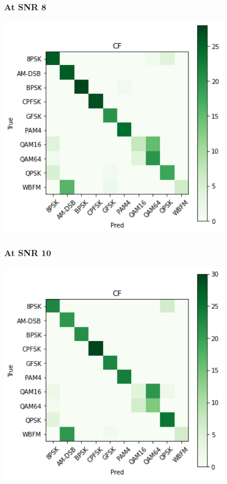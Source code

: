 \documentclass[12pt,a4paper]{article}
\begin{document}
\subsubsection{At SNR 8}
\begin{center}
\includegraphics[width=320pt]{imgs/snrs/snr10.png}
\end{center}
\subsubsection{At SNR 10}
\begin{center}
\includegraphics[width=320pt]{imgs/snrs/snr11.png}
\end{center}
\end{document}
